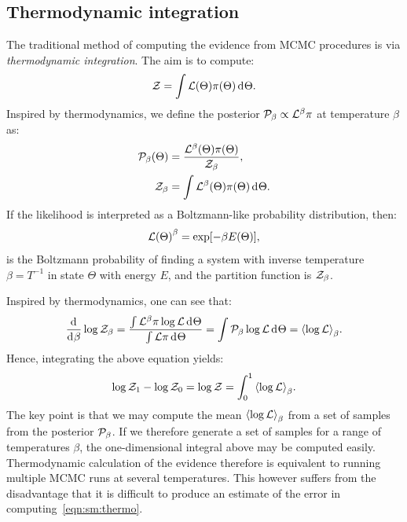 \subsection{Thermodynamic integration}
The traditional method of computing the evidence from MCMC procedures is via {\em thermodynamic integration}.
The aim is to compute:
\begin{equation}
  \mathcal{Z} = \int \mathcal{L}(\Theta) \pi(\Theta) \operatorname{d}^{}\!{\Theta}.
\end{equation}
Inspired by thermodynamics, we define the posterior \(\mathcal{P}_\beta \propto \mathcal{L}^\beta\pi\) at temperature \(\beta\) as:
\begin{align}
  \mathcal{P}_\beta(\Theta) &= \frac{\mathcal{L}^{\beta}(\Theta) \pi(\Theta)}{\mathcal{Z}_\beta}, 
  \label{eqn:bay:posteriorb}
  \\
  \mathcal{Z}_\beta &= \int\mathcal{L}^{\beta}(\Theta) \pi(\Theta) \operatorname{d}^{}\!{\Theta}.
  \label{eqn:bay:evb}
\end{align}
If the likelihood is interpreted as a Boltzmann-like probability distribution, then:
\begin{equation}
{\mathcal{L}(\Theta)}^\beta = \exp[-\beta E(\Theta)],
\end{equation}
is the Boltzmann probability of finding a system with inverse temperature \(\beta = T^{-1}\) in state \(\Theta\) with energy \(E\), and the partition function is \(\mathcal{Z}_\beta\).

Inspired by thermodynamics, one can see that:
\begin{equation}
  \frac{\operatorname{d}^{}\!{}}{\operatorname{d}^{}\!{\beta}}\log\mathcal{Z}_\beta = \frac{\int  \mathcal{L}^\beta \pi \log\mathcal{L}\operatorname{d}^{}\!{\Theta}}{\int\mathcal{L}\pi \operatorname{d}^{}\!{\Theta}} = \int \mathcal{P}_\beta \log\mathcal{L}\operatorname{d}^{}\!{\Theta} =  {\left\langle{\log\mathcal{L}}\right\rangle}_\beta.
  \label{eqn:bay:thermo}
\end{equation}
Hence, integrating the above equation yields:
\begin{equation}
  \log\mathcal{Z}_1-\log\mathcal{Z}_0 = \log\mathcal{Z} = \int_{0}^{1}{\left\langle{\log\mathcal{L}}\right\rangle}_\beta.
  \label{eqn:sm:thermo}
\end{equation}
The key point is that we may compute the mean \({\left\langle{\log\mathcal{L}}\right\rangle}_\beta\) from a set of samples from the posterior \(\mathcal{P}_\beta\). If we therefore generate a set of samples for a range of temperatures \(\beta\), the one-dimensional integral above may be computed easily. Thermodynamic calculation of the evidence therefore is equivalent to running multiple MCMC runs at several temperatures.
This however suffers from the disadvantage that it is difficult to produce an estimate of the error in computing~\eqref{eqn:sm:thermo}. 

